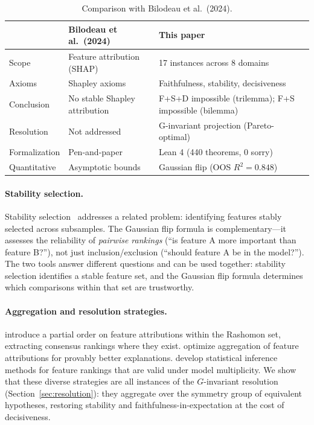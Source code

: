 \begin{table}[h]
\centering\small
\begin{tabular}{@{}lp{5cm}p{5cm}@{}}
\toprule
& \textbf{Bilodeau et al.\ (2024)} & \textbf{This paper} \\
\midrule
Scope & Feature attribution (SHAP) & 17 instances across 8 domains \\
Axioms & Shapley axioms & Faithfulness, stability, decisiveness \\
Conclusion & No stable Shapley attribution & F+S+D impossible (trilemma); F+S impossible (bilemma) \\
Resolution & Not addressed & G-invariant projection (Pareto-optimal) \\
Formalization & Pen-and-paper & Lean 4 (440 theorems, 0 sorry) \\
Quantitative & Asymptotic bounds & Gaussian flip (OOS $R^2 = 0.848$) \\
\bottomrule
\end{tabular}
\caption{Comparison with Bilodeau et al.\ (2024).}
\label{tab:bilodeau-comparison}
\end{table}

\paragraph{Stability selection.}
Stability selection~\citep{meinshausen2010stability} addresses a related
problem: identifying features stably selected across subsamples.  The Gaussian
flip formula is complementary---it assesses the reliability of \emph{pairwise
rankings} (``is feature A more important than feature B?''), not just
inclusion/exclusion (``should feature A be in the model?'').  The two tools
answer different questions and can be used together: stability selection
identifies a stable feature set, and the Gaussian flip formula determines which
comparisons within that set are trustworthy.

\paragraph{Aggregation and resolution strategies.}
\citet{laberge2023partial} introduce a partial order on feature attributions
within the Rashomon set, extracting consensus rankings where they exist.
\citet{decker2024provably} optimize aggregation of feature attributions for
provably better explanations.
\citet{herren2023statistical} develop statistical inference methods for feature
rankings that are valid under model multiplicity.  We show that these diverse
strategies are all instances of the $G$-invariant resolution
(Section~\ref{sec:resolution}): they aggregate over the symmetry group of
equivalent hypotheses, restoring stability and faithfulness-in-expectation at
the cost of decisiveness.

